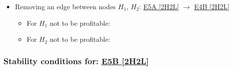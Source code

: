 \begin{itemize}
\begin{itemize}
	\end{itemize}

	\item Removing an edge between nodes $H_1$, $H_2$: \hyperref[apx:E5A:2H2L]{E5A [2H2L]} $\to$ \hyperref[apx:E4B:2H2L]{E4B [2H2L]}

	\begin{itemize}

		\item For $H_1$ not to be profitable:


		\item For $H_2$ not to be profitable:


	\end{itemize}

\end{itemize}



\subsubsection{Stability conditions for: \hyperref[apx:E5B:2H2L]{E5B [2H2L]}}
\label{apx:E5B:2H2L_stability_cond}

